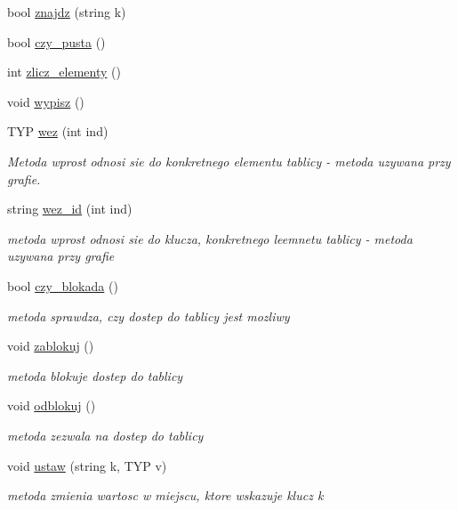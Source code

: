 \begin{DoxyCompactItemize}
bool \hyperlink{classtablica__asocjacyjna_a800e2d6366198e365a0700197b2dced4}{znajdz} (string k)
\item 
bool \hyperlink{classtablica__asocjacyjna_a671f1d928a4d91c6e7708a55b1ce85dc}{czy\-\_\-pusta} ()
\item 
int \hyperlink{classtablica__asocjacyjna_a103aa115af24abf1d08c56e14c87b249}{zlicz\-\_\-elementy} ()
\item 
void \hyperlink{classtablica__asocjacyjna_a8ecdd39391d3dc84aea809c48b52c4d6}{wypisz} ()
\item 
\-T\-Y\-P \hyperlink{classtablica__asocjacyjna_a52a9625a6eaed5c952bdb28a62b98de9}{wez} (int ind)
\begin{DoxyCompactList}\small\item\em \-Metoda wprost odnosi sie do konkretnego elementu tablicy -\/ metoda uzywana przy grafie. \end{DoxyCompactList}\item 
string \hyperlink{classtablica__asocjacyjna_ae3dd4ef48ffaacb3d6e7985241e4fcdb}{wez\-\_\-id} (int ind)
\begin{DoxyCompactList}\small\item\em metoda wprost odnosi sie do klucza, konkretnego leemnetu tablicy -\/ metoda uzywana przy grafie \end{DoxyCompactList}\item 
bool \hyperlink{classtablica__asocjacyjna_affe02061bf41d4c433ca445cae152b25}{czy\-\_\-blokada} ()
\begin{DoxyCompactList}\small\item\em metoda sprawdza, czy dostep do tablicy jest mozliwy \end{DoxyCompactList}\item 
void \hyperlink{classtablica__asocjacyjna_a1a801bb889b41a3646553d20992897f8}{zablokuj} ()
\begin{DoxyCompactList}\small\item\em metoda blokuje dostep do tablicy \end{DoxyCompactList}\item 
void \hyperlink{classtablica__asocjacyjna_a6860d1e3736a0766540d21e64c8420ac}{odblokuj} ()
\begin{DoxyCompactList}\small\item\em metoda zezwala na dostep do tablicy \end{DoxyCompactList}\item 
void \hyperlink{classtablica__asocjacyjna_a2ffe030234f0618af8a24020e909dda5}{ustaw} (string k, \-T\-Y\-P v)
\begin{DoxyCompactList}\small\item\em metoda zmienia wartosc w miejscu, ktore wskazuje klucz k \end{DoxyCompactList}\end{DoxyCompactItemize}
